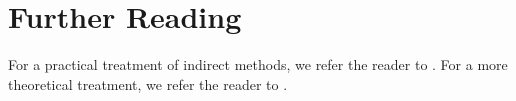 
\section{Further Reading}

For a practical treatment of indirect methods, we refer the reader to \cite{bryson1975applied}. For a more theoretical treatment, we refer the reader to \cite{lee1967foundations}.
